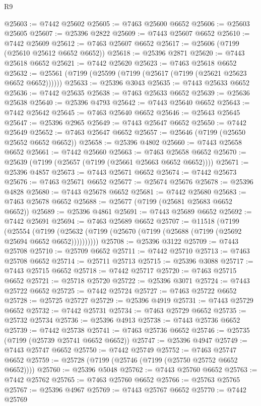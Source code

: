 \begin{lexlean}{R9}
\begin{coremodule}
{{{{{{{{{{{{{{{{{{{{{{{{{{{{{{{{{{{{{{{{{{{{{{{{{{{{{{{{{{{{{{{{{{{{{{{{{{{{{{{{{{{{@25603 := @7442 @25602
@25605 := @7463 @25600 @6652
@25606 := @25603 @25605
@25607 := @25396 @2822
@25609 := @7443 @25607 @6652
@25610 := @7442 @25609
@25612 := @7463 @25607 @6652
@25617 := @25606 (@7199 (@25610 @25612 @6652 @6652))
@25618 := @25396 @2871
@25620 := @7443 @25618 @6652
@25621 := @7442 @25620
@25623 := @7463 @25618 @6652
@25632 := @25561 (@7199 (@25599 (@7199 (@25617 (@7199 (@25621 @25623 @6652 @6652))))))
@25633 := @25396 @3043
@25635 := @7443 @25633 @6652
@25636 := @7442 @25635
@25638 := @7463 @25633 @6652
@25639 := @25636 @25638
@25640 := @25396 @4793
@25642 := @7443 @25640 @6652
@25643 := @7442 @25642
@25645 := @7463 @25640 @6652
@25646 := @25643 @25645
@25647 := @25396 @2965
@25649 := @7443 @25647 @6652
@25650 := @7442 @25649
@25652 := @7463 @25647 @6652
@25657 := @25646 (@7199 (@25650 @25652 @6652 @6652))
@25658 := @25396 @4802
@25660 := @7443 @25658 @6652
@25661 := @7442 @25660
@25663 := @7463 @25658 @6652
@25670 := @25639 (@7199 (@25657 (@7199 (@25661 @25663 @6652 @6652))))
@25671 := @25396 @4857
@25673 := @7443 @25671 @6652
@25674 := @7442 @25673
@25676 := @7463 @25671 @6652
@25677 := @25674 @25676
@25678 := @25396 @4828
@25680 := @7443 @25678 @6652
@25681 := @7442 @25680
@25683 := @7463 @25678 @6652
@25688 := @25677 (@7199 (@25681 @25683 @6652 @6652))
@25689 := @25396 @4861
@25691 := @7443 @25689 @6652
@25692 := @7442 @25691
@25694 := @7463 @25689 @6652
@25707 := @11518
    (@7199
      (@25554
        (@7199 (@25632 (@7199 (@25670 (@7199 (@25688 (@7199 (@25692 @25694 @6652 @6652))))))))))
@25708 := @25396 @3122
@25709 := @7443 @25708
@25710 := @25709 @6652
@25711 := @7442 @25710
@25713 := @7463 @25708 @6652
@25714 := @25711 @25713
@25715 := @25396 @3088
@25717 := @7443 @25715 @6652
@25718 := @7442 @25717
@25720 := @7463 @25715 @6652
@25721 := @25718 @25720
@25722 := @25396 @3071
@25724 := @7443 @25722 @6652
@25725 := @7442 @25724
@25727 := @7463 @25722 @6652
@25728 := @25725 @25727
@25729 := @25396 @4919
@25731 := @7443 @25729 @6652
@25732 := @7442 @25731
@25734 := @7463 @25729 @6652
@25735 := @25732 @25734
@25736 := @25396 @4913
@25738 := @7443 @25736 @6652
@25739 := @7442 @25738
@25741 := @7463 @25736 @6652
@25746 := @25735 (@7199 (@25739 @25741 @6652 @6652))
@25747 := @25396 @4947
@25749 := @7443 @25747 @6652
@25750 := @7442 @25749
@25752 := @7463 @25747 @6652
@25759 := @25728 (@7199 (@25746 (@7199 (@25750 @25752 @6652 @6652))))
@25760 := @25396 @5048
@25762 := @7443 @25760 @6652
@25763 := @7442 @25762
@25765 := @7463 @25760 @6652
@25766 := @25763 @25765
@25767 := @25396 @4967
@25769 := @7443 @25767 @6652
@25770 := @7442 @25769
}}}}}}}}}}}}}}}}}}}}}}}}}}}}}}}}}}}}}}}}}}}}}}}}}}}}}}}}}}}}}}}}}}}}}}}}}}}}}}}}}}}}
\end{coremodule}
\end{lexlean}
